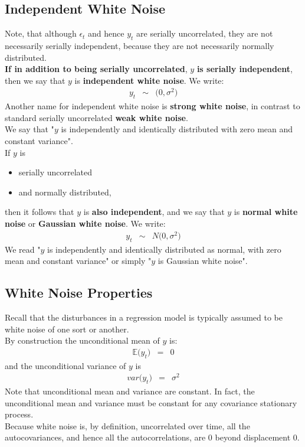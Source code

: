 \subsection{Independent White Noise}
Note, that although $\epsilon_{t}$ and hence $y_{t}$ are serially uncorrelated, they are not necessarily serially independent, because they are not necessarily normally distributed.\\
\textbf{\color{ForestGreen}If in addition to being serially uncorrelated}, $y$ \textbf{\color{ForestGreen}is serially independent}, then we say that $y$ is \textbf{\color{blue}independent white noise}. We write:
\begin{eqnarray}
	y_{t} &\sim& \big(0, \sigma^{2}\big)
\end{eqnarray}
Another name for independent white noise is \textbf{\color{blue}strong white noise}, in contrast to standard serially uncorrelated \textbf{\color{blue}weak white noise}.\\
We say that "$y$ is independently and identically distributed with zero mean and constant variance".\\
If $y$ is
\begin{itemize}
	\item serially uncorrelated 
	\item and normally distributed,
\end{itemize}
then it follows that $y$ is \textbf{\color{ForestGreen}also independent}, and we say that $y$ is \textbf{\color{blue}normal white noise} or \textbf{\color{blue}Gaussian white noise}. We write:
\begin{eqnarray}
	y_{t} &\sim& N\Big(0, \sigma^{2}\Big)
\end{eqnarray}
We read "$y$ is independently and identically distributed as normal, with zero mean and constant variance" or simply "$y$ is Gaussian white noise".


\subsection{White Noise Properties}
Recall that the disturbances in a regression model is typically assumed to be white noise of one sort or another.\\
By construction the unconditional mean of  $y$ is:
\begin{eqnarray}
\mathbb{E}\Big(y_{t}\Big) &=& 0
\end{eqnarray}
and the unconditional variance of $y$ is
\begin{eqnarray}
	var\Big(y_{t}\Big) &=& \sigma^{2}
\end{eqnarray}
Note that unconditional mean and variance are constant. In fact, the unconditional mean and variance must be constant for any covariance stationary process.\\
Because white noise is, by definition, uncorrelated over time, all the autocovariances, and hence all the autocorrelations, are 0 beyond displacement 0.

